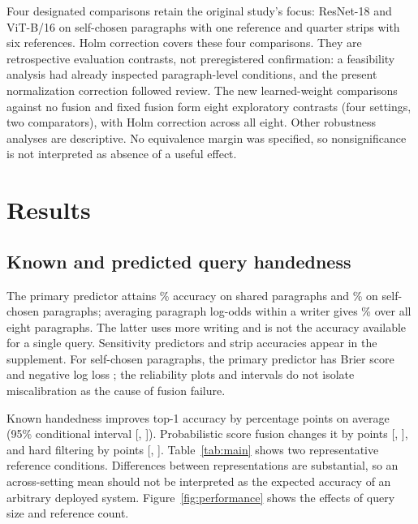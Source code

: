 \documentclass[5p,times,twocolumn,final,numbers,sort&compress]{elsarticle}
\begin{document}
Four designated comparisons retain the original study's focus: ResNet-18 and ViT-B/16 on self-chosen paragraphs with one reference and quarter strips with six references. Holm correction covers these four comparisons. They are retrospective evaluation contrasts, not preregistered confirmation: a feasibility analysis had already inspected paragraph-level conditions, and the present normalization correction followed review. The new learned-weight comparisons against no fusion and fixed fusion form eight exploratory contrasts (four settings, two comparators), with Holm correction across all eight. Other robustness analyses are descriptive. No equivalence margin was specified, so nonsignificance is not interpreted as absence of a useful effect.

\section{Results}
\subsection{Known and predicted query handedness}
The primary predictor attains \rHandShared\% accuracy on shared paragraphs and \rHandOwn\% on self-chosen paragraphs; averaging paragraph log-odds within a writer gives \rHandWriter\% over all eight paragraphs. The latter uses more writing and is not the accuracy available for a single query. Sensitivity predictors and strip accuracies appear in the supplement. For self-chosen paragraphs, the primary predictor has Brier score \rBrierOwn{} and negative log loss \rNllOwn{}; the reliability plots and intervals do not isolate miscalibration as the cause of fusion failure.

Known handedness improves top-1 accuracy by \rKnownGain{} percentage points on average (95\% conditional interval [\rKnownLo, \rKnownHi]). Probabilistic score fusion changes it by \rFusionGain{} points [\rFusionLo, \rFusionHi], and hard filtering by \rFilterGain{} points [\rFilterLo, \rFilterHi]. Table~\ref{tab:main} shows two representative reference conditions. Differences between representations are substantial, so an across-setting mean should not be interpreted as the expected accuracy of an arbitrary deployed system. Figure~\ref{fig:performance} shows the effects of query size and reference count.
\end{document}
